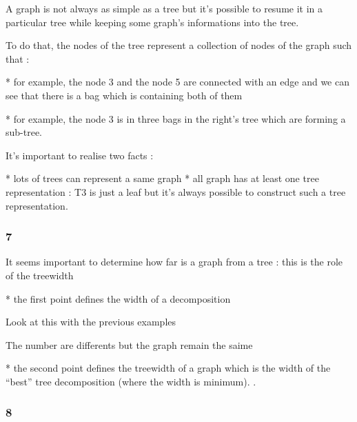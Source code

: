 \documentclass[a4paper, 10pt,french,landscape]{article}
\begin{document}
\begin{multicols}{3}
A graph is not always as simple as a tree but it's possible to resume it  in a particular tree while keeping some graph's informations into the tree. 

To do that, the nodes of the tree represent a collection of nodes of the graph such that : 

* for example, the node 3 and the node 5 are connected with an edge and we can see that there is a bag which is containing both of them

* for example, the node 3 is in three bags in the right's tree which are forming a sub-tree.

It's important to realise two facts : 

* lots of  trees can represent a same graph
* all graph has at least one tree representation : T3 is just a leaf but it's always possible to construct such a tree representation.


\subsubsection*{ 7}


It seems important to determine how far is a graph from a tree : this is the role of the treewidth

* the first point defines the width of a decomposition

Look at this with the previous examples


The number are differents but the graph remain the saime

* the second point defines the treewidth of a graph which is the width of the ``best'' tree decomposition (where the width is minimum).
.








\subsubsection*{ 8}


\end{multicols}
\end{document}
